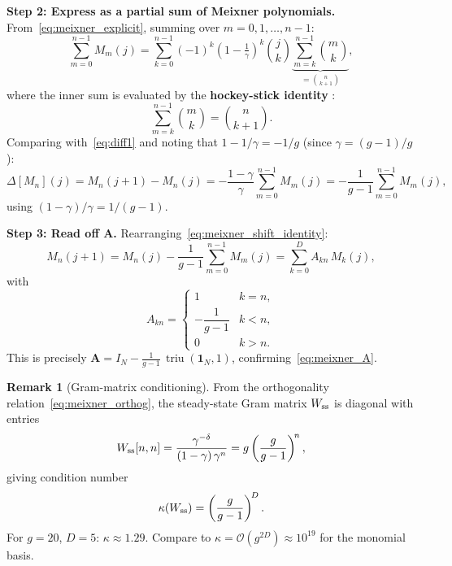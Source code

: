 \documentclass[11pt, a4paper]{article}
\theoremstyle{definition}
\newtheorem{remark}{Remark}
\newcommand{\mA}{\bm{A}}
\newcommand{\triu}{\operatorname{triu}}
\begin{document}
\medskip
\noindent\textbf{Step 2: Express as a partial sum of Meixner polynomials.}
From~\eqref{eq:meixner_explicit}, summing over $m = 0, 1, \ldots, n-1$:
\[
  \sum_{m=0}^{n-1} M_m(j)
  = \sum_{k=0}^{n-1} (-1)^k\!\left(1-\tfrac{1}{\gamma}\right)^k\binom{j}{k}
    \underbrace{\sum_{m=k}^{n-1}\binom{m}{k}}_{= \binom{n}{k+1}},
\]
where the inner sum is evaluated by the \textbf{hockey-stick identity}
\cite{Graham1994}:
\begin{equation}
  \sum_{m=k}^{n-1}\binom{m}{k} = \binom{n}{k+1}.
  \label{eq:hockeystick}
\end{equation}
Comparing with~\eqref{eq:diff1} and noting that
$1-1/\gamma = -1/g$ (since $\gamma=(g-1)/g$):
\begin{equation}
  \Delta[M_n](j) = M_n(j+1) - M_n(j)
  = -\frac{1-\gamma}{\gamma} \sum_{m=0}^{n-1} M_m(j)
  = -\frac{1}{g-1} \sum_{m=0}^{n-1} M_m(j),
  \label{eq:meixner_shift_identity}
\end{equation}
using $(1-\gamma)/\gamma = 1/(g-1)$.

\medskip
\noindent\textbf{Step 3: Read off $\mA$.}
Rearranging~\eqref{eq:meixner_shift_identity}:
\[
  M_n(j+1) = M_n(j) - \frac{1}{g-1}\sum_{m=0}^{n-1}M_m(j)
  = \sum_{k=0}^{D} A_{kn}\, M_k(j),
\]
with
\[
  A_{kn} =
  \begin{cases}
    1           & k = n, \\
    -\dfrac{1}{g-1} & k < n, \\
    0           & k > n.
  \end{cases}
\]
This is precisely $\mA = I_N - \tfrac{1}{g-1}\,\triu(\mathbf{1}_N, 1)$, confirming~\eqref{eq:meixner_A}.

\begin{remark}[Gram-matrix conditioning]
From the orthogonality relation~\eqref{eq:meixner_orthog}, the steady-state
Gram matrix $W_{\rm ss}$ is diagonal with entries
\begin{equation}
  W_{\rm ss}[n, n] = \frac{\gamma^{-\delta}}{(1-\gamma)\,\gamma^n}
                  = g \left(\frac{g}{g-1}\right)^{\!n},
\end{equation}
giving condition number
\[
  \kappa(W_{\rm ss}) = \left(\frac{g}{g-1}\right)^{\!D}.
\]
For $g=20$, $D=5$: $\kappa \approx 1.29$.  Compare to $\kappa = \mathcal{O}(g^{2D}) \approx 10^{19}$
for the monomial basis.
\end{remark}
\end{document}
